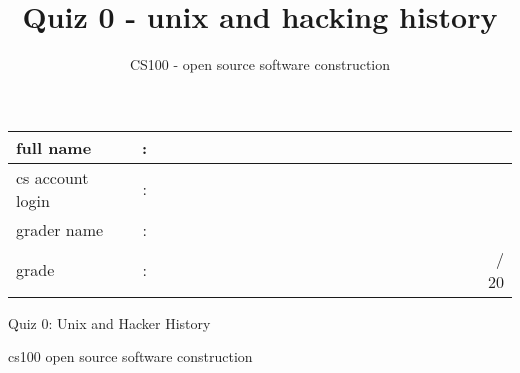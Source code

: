 \documentclass{article}
\title{Quiz 0 - unix and hacking history}
\author{CS100 - open source software construction}
\begin{document}
\renewcommand{\arraystretch}{2}
\hfill
\begin{tabular}{lcr}
full name & : &\\
\hline
cs account login & :  & \\
\hline
grader name & : & \\
\hline
grade & : & ~~~~~~~~~~~~~~~~~~~~~~~~~~~~~~~~~~~~~~~/ 20\\
\hline
\end{tabular}

\vspace{0.25in}
\begin{center}
{ \huge
Quiz 0: Unix and Hacker History
}

{ \Large
cs100 open source software construction
}
\end{center}
\vspace{0.15in}
\end{document}
